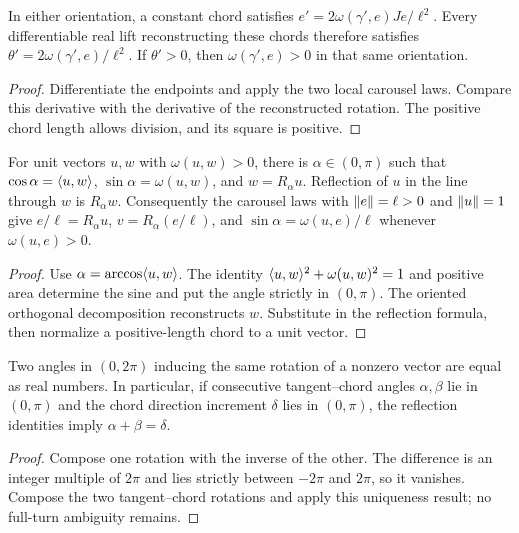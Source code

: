 \begin{proposition}
\label{prop:chord-angle-speed}
\leanok
{}
In either orientation, a constant chord satisfies
$e'=2\omega(\gamma',e)Je/\ell^2$. Every differentiable real lift
reconstructing these chords therefore satisfies
$\theta'=2\omega(\gamma',e)/\ell^2$.
If $\theta'>0$, then $\omega(\gamma',e)>0$ in that same orientation.
\end{proposition}
\begin{proof}
\leanok
Differentiate the endpoints and apply the two local carousel laws.
Compare this derivative with the derivative of the reconstructed rotation.
The positive chord length allows division, and its square is positive.
\end{proof}

\begin{lemma}
\label{lem:positive-chord-angle}
\leanok
{}
For unit vectors $u,w$ with $\omega(u,w)>0$, there is
$\alpha\in(0,\pi)$ such that
$\cos\alpha=\langle u,w\rangle$, $\sin\alpha=\omega(u,w)$, and
$w=R_\alpha u$. Reflection of $u$ in the line through $w$ is $R_\alpha w$.
Consequently the carousel laws with $\lVert e\rVert=\ell>0$ and $\lVert u\rVert=1$
give $e/\ell=R_\alpha u$, $v=R_\alpha(e/\ell)$, and
$\sin\alpha=\omega(u,e)/\ell$ whenever $\omega(u,e)>0$.
\end{lemma}
\begin{proof}
\leanok
Use $\alpha=\arccos\langle u,w\rangle$. The identity
$\langle u,w\rangle^2+\omega(u,w)^2=1$ and positive area determine the sine and
put the angle strictly in $(0,\pi)$. The oriented orthogonal decomposition
reconstructs $w$. Substitute in the reflection formula, then normalize
a positive-length chord to a unit vector.
\end{proof}

\begin{lemma}
\label{lem:tangent-angle-add}
\leanok
{}
Two angles in $(0,2\pi)$ inducing the same rotation of a nonzero vector
are equal as real numbers. In particular, if consecutive tangent--chord
angles $\alpha,\beta$ lie in $(0,\pi)$ and the chord direction increment
$\delta$ lies in $(0,\pi)$, the reflection identities imply
$\alpha+\beta=\delta$.
\end{lemma}
\begin{proof}
\leanok
Compose one rotation with the inverse of the other. The difference is
an integer multiple of $2\pi$ and lies strictly between $-2\pi$ and $2\pi$,
so it vanishes. Compose the two tangent--chord rotations and apply this
uniqueness result; no full-turn ambiguity remains.
\end{proof}


